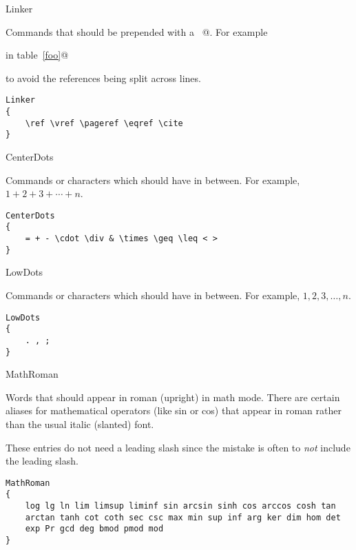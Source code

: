 \begin{chktexrclistvar}{Linker}

Commands that should be prepended with a \verb@~@.  For example
\begin{errexam}
\verb@look in table~\ref{foo}@
\end{errexam}
to avoid the references being split across lines.

\chktexrcdefault\begin{verbatim}
Linker
{
    \ref \vref \pageref \eqref \cite
}
\end{verbatim}
\end{chktexrclistvar}


\begin{chktexrclistvar}{CenterDots}

Commands or characters which should have \verb@\cdots@ in between.
For example, $1+2+3+\cdots+n$.

\chktexrcdefault\begin{verbatim}
CenterDots
{
    = + - \cdot \div & \times \geq \leq < >
}
\end{verbatim}
\end{chktexrclistvar}


\begin{chktexrclistvar}{LowDots}

Commands or characters which should have \verb@\ldots@ in between.
For example, $1,2,3,\ldots,n$.

\chktexrcdefault\begin{verbatim}
LowDots
{
    . , ;
}
\end{verbatim}
\end{chktexrclistvar}


\begin{chktexrclistvar}{MathRoman}

Words that should appear in roman (upright) in math mode.  There are
certain aliases for mathematical operators (like sin or cos) that
appear in roman rather than the usual italic (slanted) font.

These entries do not need a leading slash since the mistake is often
to \emph{not} include the leading slash.

\chktexrcdefault\begin{verbatim}
MathRoman
{
    log lg ln lim limsup liminf sin arcsin sinh cos arccos cosh tan
    arctan tanh cot coth sec csc max min sup inf arg ker dim hom det
    exp Pr gcd deg bmod pmod mod
}
\end{verbatim}
\end{chktexrclistvar}


